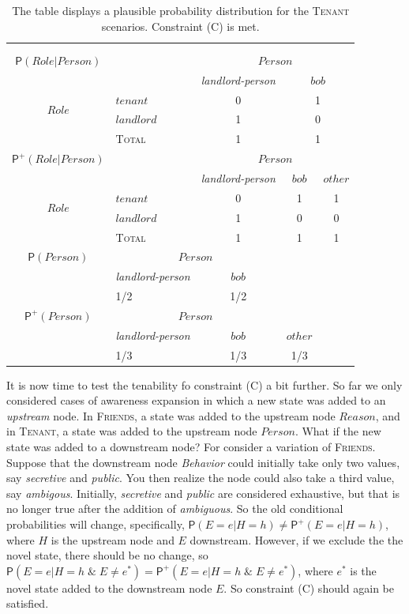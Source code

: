 \documentclass[
  11pt,
  dvipsnames,enabledeprecatedfontcommands]{scrartcl}
\newcommand{\pr}[1]{\ensuremath{\mathsf{P}(#1)}}
\newcommand{\ppr}[2]{\ensuremath{\mathsf{P}^{#1}(#2)}}
\begin{document}
\begin{table}
\begin{tabular}{clccc}
&&&&\\
&&&&\\
$\pr{Role \vert Person}$ & & \multicolumn{3}{c}{$Person$} \\
 &   & \textit{landlord-person}  & \multicolumn{2}{c}{$bob$} \\
\multirow{2}{*}{$Role$} & $tenant$ & 0 & \multicolumn{2}{c}{1}\\
& $landlord$  & 1 & \multicolumn{2}{c}{0} \\
\hline
& \textsc{Total} & 1 & \multicolumn{2}{c}{1}  \\
\hline
\hline
$\ppr{+}{Role \vert Person}$ & & \multicolumn{3}{c}{$Person$} \\
&  & \textit{landlord-person} & $bob$ & $other$ \\
\multirow{2}{*}{$Role$} & $tenant$ & 0 & 1 & 1\\ 
& $landlord$ & 1 & 0 & 0 \\
\hline
& \textsc{Total} & 1 & 1 & 1  \\
\hline
\hline
$\pr{Person}$ & \multicolumn{2}{c}{$Person$} & \\
&  \textit{landlord-person} & $bob$ & \\
& 1/2 & 1/2 & \\
\hline
\hline
$\ppr{+}{Person}$ & \multicolumn{2}{c}{$Person$} & \\
&  \textit{landlord-person} & $bob$ & $other$ \\
& 1/3 & 1/3 & 1/3 \\
\end{tabular}
\caption{The table displays a plausible probability distribution for the \textsc{Tenant} scenarios. Constraint (C) is met.}
\label{table:tenant}
\end{table}

It is now time to test the tenability fo constraint (C) a bit further.
So far we only considered cases of awareness expansion in which a new
state was added to an \emph{upstream} node. In \textsc{Friends}, a state
was added to the upstream node \(Reason\), and in \textsc{Tenant}, a
state was added to the upstream node \(Person\). What if the new state
was added to a downstream node? For consider a variation of
\textsc{Friends}. Suppose that the downstream node \textit{Behavior}
could initially take only two values, say \textit{secretive} and
\textit{public}. You then realize the node could also take a third
value, say \textit{ambigous}. Initially, \textit{secretive} and
\textit{public} are considered exhaustive, but that is no longer true
after the addition of \textit{ambiguous}. So the old conditional
probabilities will change, specifically,
\(\pr{E=e \vert H=h}\neq \ppr{+}{E=e \vert H=h}\), where \(H\) is the
upstream node and \(E\) downstream. However, if we exclude the the novel
state, there should be no change, so
\(\pr{E=e \vert H=h \; \& \; E\neq e^* } = \ppr{+}{E=e \vert H=h \; \& \; E\neq e^*}\),
where \(e^*\) is the novel state added to the downstream node \(E\). So
constraint (C) should again be satisfied.
\end{document}
